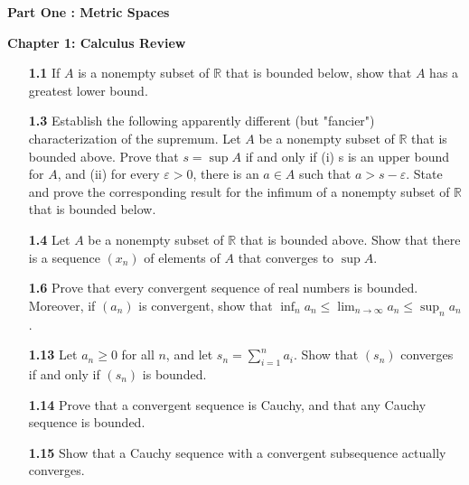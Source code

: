 \documentclass[12pt]{amsart}
\def\RR{{\mathbb R}}
\renewcommand{\epsilon}{\varepsilon}
\begin{document}
\begin{center}
{\bf \Large Part One : Metric Spaces}
\end{center}

\hspace{10pt}

{\bf Chapter 1: Calculus Review}

\medskip

\begin{enumerate}

\item[\bf 1.1] If $A$ is a nonempty subset of $\RR$ that is bounded below, show that $A$ has a greatest lower bound.

\bigskip

\item[\bf 1.3] Establish the following apparently different (but "fancier") characterization of the supremum. Let $A$ be a nonempty subset of $\RR$ that is bounded above. Prove that $s=\sup A$ if and only if (i) s is an upper bound for $A$, and (ii) for every $\epsilon>0$, there is an $a\in A$ such that $a>s-\epsilon$. State and prove the corresponding result for the infimum of a nonempty subset of $\RR$ that is bounded below. 

\bigskip

\item[\bf 1.4] Let $A$ be a nonempty subset of $\RR$ that is bounded above. Show that there is a sequence $(x_n)$ of elements of $A$ that converges to $\sup A$. 

\bigskip

\item[\bf 1.6] Prove that every convergent sequence of real numbers is bounded. Moreover, if $(a_n)$ is convergent, show that $\inf_n a_n \leq \lim_{n\to\infty}a_n \leq \sup_n a_n$.

\bigskip

\item[\bf 1.13] Let $a_n\geq 0$ for all $n$, and let $s_n=\sum_{i=1}^n a_i$. Show that $(s_n)$ converges if and only if $(s_n)$ is bounded. 

\bigskip

\item[\bf 1.14] Prove that a convergent sequence is Cauchy, and that any Cauchy sequence is bounded. 

\bigskip

\item[\bf 1.15] Show that a Cauchy sequence with a convergent subsequence actually converges.


\end{enumerate}
\end{document}
